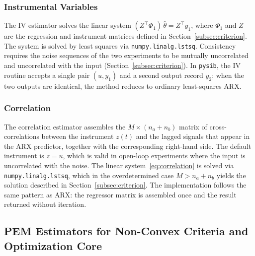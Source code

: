 \documentclass[acmsmall,screen,review]{acmart}
\begin{document}
\subsubsection{Instrumental Variables}
\label{subsubsec:iv}

The IV estimator solves the linear system
$(Z^\top\Phi_1)\,\hat\theta = Z^\top y_1$,
where $\Phi_1$ and $Z$ are the regression and instrument matrices
defined in Section~\ref{subsec:criterion}.
The system is solved by least squares via
\texttt{numpy.linalg.lstsq}.
Consistency requires the noise sequences of the two experiments to be
mutually uncorrelated and uncorrelated with the input
(Section~\ref{subsec:criterion}).
In \texttt{pysib}, the IV routine accepts a single pair
$(u, y_1)$ and a second output record $y_2$; when the two outputs
are identical, the method reduces to ordinary least-squares ARX.

\subsubsection{Correlation}
\label{subsubsec:correlation}

The correlation estimator assembles the $M \times (n_a+n_b)$ matrix
of cross-correlations between the instrument $z(t)$ and the lagged
signals that appear in the ARX predictor, together with the
corresponding right-hand side.
The default instrument is $z = u$, which is valid in open-loop
experiments where the input is uncorrelated with the noise.
The linear system~\eqref{eq:correlation} is solved via
\texttt{numpy.linalg.lstsq}, which in the overdetermined case
$M > n_a + n_b$ yields the solution described in
Section~\ref{subsec:criterion}.
The implementation follows the same pattern as ARX: the regressor
matrix is assembled once and the result returned without iteration.

\subsection{PEM Estimators for Non-Convex Criteria and Optimization Core}
\label{subsec:nonlinear-optimization-core}
\end{document}
